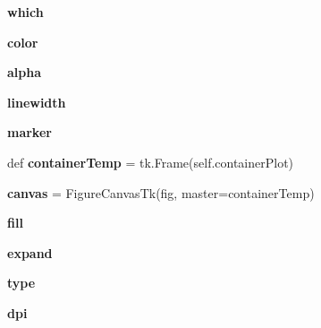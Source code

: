 \begin{DoxyCompactItemize}
\item 
\mbox{\label{class_f_plots_1_1_frm_plots_a40b5ec2f455aafcdf87faa2a2ec10c59}} 
{\bfseries which}
\item 
\mbox{\label{class_f_plots_1_1_frm_plots_a37dbdc30935031c05304482e1be89d8f}} 
{\bfseries color}
\item 
\mbox{\label{class_f_plots_1_1_frm_plots_a62197192f0fbf4e0675eb37be1c4c175}} 
{\bfseries alpha}
\item 
\mbox{\label{class_f_plots_1_1_frm_plots_a7e578341f85bc42faf7d4b5ba2a3c0b4}} 
{\bfseries linewidth}
\item 
\mbox{\label{class_f_plots_1_1_frm_plots_a13369eabab3d7ad2773a340258a8fc43}} 
{\bfseries marker}
\item 
\mbox{\label{class_f_plots_1_1_frm_plots_a696c7ad9d1499c042709048d0c80a392}} 
def {\bfseries container\+Temp} = tk.\+Frame(self.\+container\+Plot)
\item 
\mbox{\label{class_f_plots_1_1_frm_plots_afa9e9838abb44338f7cbe41dc6f846d4}} 
{\bfseries canvas} = Figure\+Canvas\+Tk(fig, master=container\+Temp)
\item 
\mbox{\label{class_f_plots_1_1_frm_plots_a23b3ecc690a716b53e9d0146b78d5ef2}} 
{\bfseries fill}
\item 
\mbox{\label{class_f_plots_1_1_frm_plots_a6d75829fbffb45805b5472b9db7a54b9}} 
{\bfseries expand}
\item 
\mbox{\label{class_f_plots_1_1_frm_plots_a7aead736a07eaf25623ad7bfa1f0ee2d}} 
{\bfseries type}
\item 
\mbox{\label{class_f_plots_1_1_frm_plots_ab4024db5b48e2ddd9bcd43847f10f016}} 
{\bfseries dpi}
\item 
\mbox{\label{class_f_plots_1_1_frm_plots_ac51b57a703ba1c5869228690c93e1701}} 

\end{DoxyCompactItemize}
